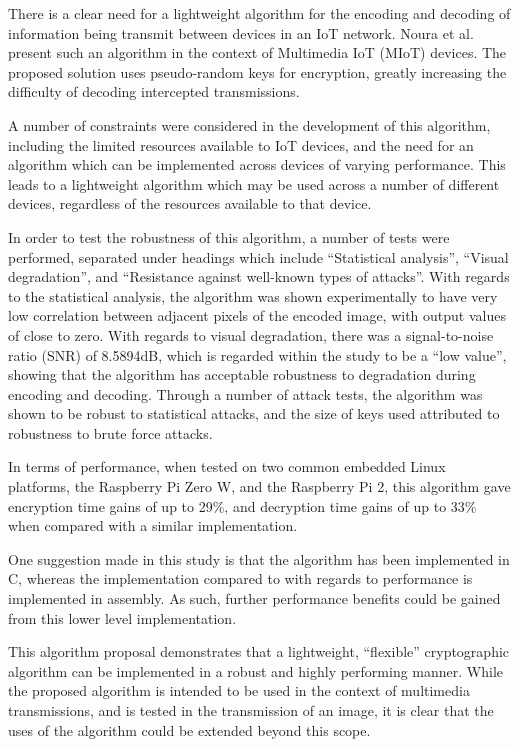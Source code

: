 There is a clear need for a lightweight algorithm for the encoding and decoding
of information being transmit between devices in an IoT network. Noura et al.
present such an algorithm in the context of Multimedia IoT (MIoT) devices. The
proposed solution uses pseudo-random keys for encryption, greatly increasing the
difficulty of decoding intercepted transmissions\cite{iotalgorithm}.

A number of constraints were considered in the development of this algorithm,
including the limited resources available to IoT devices, and the need for an
algorithm which can be implemented across devices of varying performance. This
leads to a lightweight algorithm which may be used across a number of different
devices, regardless of the resources available to that device.

In order to test the robustness of this algorithm, a number of tests were
performed, separated under headings which include ``Statistical analysis'', ``Visual
degradation'', and ``Resistance against well-known types of attacks''. With
regards to the statistical analysis, the algorithm was shown experimentally to
have very low correlation between adjacent pixels of the encoded image, with
output values of close to zero. With regards to visual degradation, there was a
signal-to-noise ratio (SNR) of 8.5894dB, which is regarded within the study to
be a ``low value'', showing that the algorithm has acceptable robustness to
degradation during encoding and decoding. Through a number of attack tests, the
algorithm was shown to be robust to statistical attacks, and the size of keys
used attributed to robustness to brute force attacks.

In terms of performance, when tested on two common embedded Linux platforms, the
Raspberry Pi Zero W, and the Raspberry Pi 2, this algorithm gave encryption time
gains of up to 29\%, and decryption time gains of up to 33\% when compared with
a similar implementation.

One suggestion made in this study is that the algorithm has been implemented in
C, whereas the implementation compared to with regards to performance is
implemented in assembly. As such, further performance benefits could be gained
from this lower level implementation.

This algorithm proposal demonstrates that a lightweight, ``flexible''
cryptographic algorithm can be implemented in a robust and highly performing manner.
While the proposed algorithm is intended to be used in the context of multimedia
transmissions, and is tested in the transmission of an image, it is clear that
the uses of the algorithm could be extended beyond this scope.
